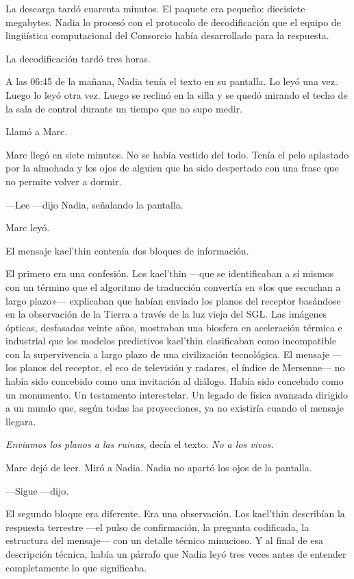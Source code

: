 \documentclass[11pt,a5paper,twoside]{book}
\begin{document}
La descarga tardó cuarenta minutos. El paquete era pequeño: diecisiete megabytes. Nadia lo procesó con el protocolo de decodificación que el equipo de lingüística computacional del Consorcio había desarrollado para la respuesta.

La decodificación tardó tres horas.

A las 06:45 de la mañana, Nadia tenía el texto en su pantalla. Lo leyó una vez. Luego lo leyó otra vez. Luego se reclinó en la silla y se quedó mirando el techo de la sala de control durante un tiempo que no supo medir.

Llamó a Marc.

Marc llegó en siete minutos. No se había vestido del todo. Tenía el pelo aplastado por la almohada y los ojos de alguien que ha sido despertado con una frase que no permite volver a dormir.

—Lee —dijo Nadia, señalando la pantalla.

Marc leyó.

El mensaje kael'thin contenía dos bloques de información.

El primero era una confesión. Los kael'thin —que se identificaban a sí mismos con un término que el algoritmo de traducción convertía en «los que escuchan a largo plazo»— explicaban que habían enviado los planos del receptor basándose en la observación de la Tierra a través de la luz vieja del SGL. Las imágenes ópticas, desfasadas veinte años, mostraban una biosfera en aceleración térmica e industrial que los modelos predictivos kael'thin clasificaban como incompatible con la supervivencia a largo plazo de una civilización tecnológica. El mensaje —los planos del receptor, el eco de televisión y radares, el índice de Mersenne— no había sido concebido como una invitación al diálogo. Había sido concebido como un monumento. Un testamento interestelar. Un legado de física avanzada dirigido a un mundo que, según todas las proyecciones, ya no existiría cuando el mensaje llegara.

\textit{Enviamos los planos a las ruinas}, decía el texto. \textit{No a los vivos.}

Marc dejó de leer. Miró a Nadia. Nadia no apartó los ojos de la pantalla.

—Sigue —dijo.

El segundo bloque era diferente. Era una observación. Los kael'thin describían la respuesta terrestre —el pulso de confirmación, la pregunta codificada, la estructura del mensaje— con un detalle técnico minucioso. Y al final de esa descripción técnica, había un párrafo que Nadia leyó tres veces antes de entender completamente lo que significaba.
\end{document}
